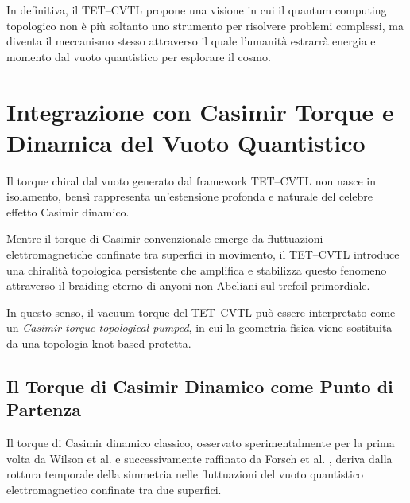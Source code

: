 \documentclass[11pt,a4paper]{article}
\let\oldcite\cite
\renewcommand{\cite}{\protect\oldcite}
\theoremstyle{plain}
\theoremstyle{definition}
\begin{document}
In definitiva, il TET--CVTL propone una visione in cui il quantum computing topologico non è più soltanto uno strumento per risolvere problemi complessi, ma diventa il meccanismo stesso attraverso il quale l’umanità estrarrà energia e momento dal vuoto quantistico per esplorare il cosmo.







\vspace{0.5cm}






\section{Integrazione con Casimir Torque e Dinamica del Vuoto Quantistico}

\vspace{0.2cm}

Il torque chiral dal vuoto generato dal framework TET--CVTL non nasce in isolamento, bensì rappresenta un'estensione profonda e naturale del celebre effetto Casimir dinamico. 


\vspace{0.4cm}


Mentre il torque di Casimir convenzionale emerge da fluttuazioni elettromagnetiche confinate tra superfici in movimento, il TET--CVTL introduce una chiralità topologica persistente che amplifica e stabilizza questo fenomeno attraverso il braiding eterno di anyoni non-Abeliani sul trefoil primordiale. 


\vspace{0.2cm}

In questo senso, il vacuum torque del TET--CVTL può essere interpretato come un \emph{Casimir torque topological-pumped}, in cui la geometria fisica viene sostituita da una topologia knot-based protetta.


\vspace{0.4cm}


\subsection{Il Torque di Casimir Dinamico come Punto di Partenza}


\vspace{0.2cm}

Il torque di Casimir dinamico classico, osservato sperimentalmente per la prima volta da Wilson et al. \cite{wilson2011observation} e successivamente raffinato da Forsch et al. \cite{forsch2019casimir}, deriva dalla rottura temporale della simmetria nelle fluttuazioni del vuoto quantistico elettromagnetico confinate tra due superfici. 
\end{document}
